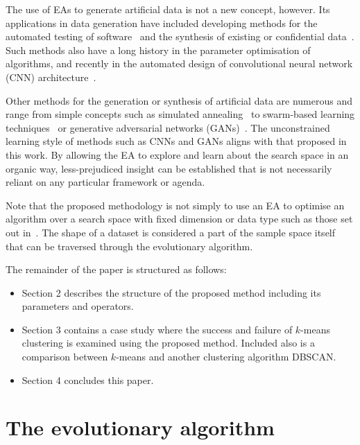 
The use of EAs to generate artificial data is not a new concept, however. Its
applications in data generation have included developing methods for the
automated testing of software~\cite{Koleejan2015,Michael2001,Sharifipour2018}
and the synthesis of existing or confidential data~\cite{Chen2016}. Such methods
also have a long history in the parameter optimisation of algorithms, and
recently in the automated design of convolutional neural network (CNN)
architecture~\cite{Suganuma2017,Sun2018}.

Other methods for the generation or synthesis of artificial data are numerous
and range from simple concepts such as simulated annealing~\cite{Matejka2017}
to swarm-based learning techniques~\cite{Abualigah2018b} or generative
adversarial networks (GANs)~\cite{Goodfellow2014}. The unconstrained learning
style of methods such as CNNs and GANs aligns with that proposed in this work.
By allowing the EA to explore and learn about the search space in an organic
way, less-prejudiced insight can be established that is not necessarily reliant
on any particular framework or agenda.

Note that the proposed methodology is not simply to use an EA to optimise an
algorithm over a search space with fixed dimension or data type such as those
set out in~\cite{Chen2016}. The shape of a dataset is considered a part of the
sample space itself that can be traversed through the evolutionary algorithm.

The remainder of the paper is structured as follows:
\begin{itemize}
    \item Section 2 describes the structure of the proposed method including its
        parameters and operators.
    \item Section 3 contains a case study where the success and failure of
        \(k\)-means clustering is examined using the proposed method. Included
        also is a comparison between \(k\)-means and another clustering
        algorithm DBSCAN.\
    \item Section 4 concludes this paper.
\end{itemize}

\section{The evolutionary algorithm}\label{section:algorithm}

